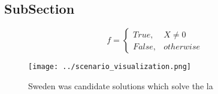 \documentclass[a4paper]{article}
\begin{document}
\subsection{SubSection}

\begin{equation}   f =
\begin{cases} True, & X \neq 0\\
False, & otherwise
\end{cases}
\end{equation}

\begin{figure}
\centering
\texttt{[image: ../scenario\_visualization.png]}
\caption{Sweden was candidate solutions which solve the la
}
\end{figure}
 
\end{document}
